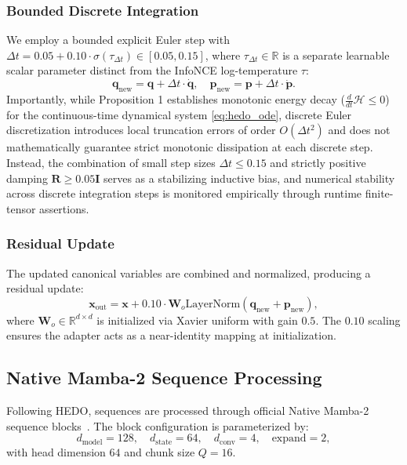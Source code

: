 \documentclass[conference]{IEEEtran}
\begin{document}
\subsubsection{Bounded Discrete Integration}
We employ a bounded explicit Euler step with $\Delta t = 0.05 + 0.10 \cdot \sigma(\tau_{\Delta t}) \in [0.05, 0.15]$, where $\tau_{\Delta t} \in \mathbb{R}$ is a separate learnable scalar parameter distinct from the InfoNCE log-temperature $\tau$:
\begin{equation}
\label{eq:euler_step}
\mathbf{q}_{\mathrm{new}} = \mathbf{q} + \Delta t \cdot \dot{\mathbf{q}}, \quad \mathbf{p}_{\mathrm{new}} = \mathbf{p} + \Delta t \cdot \dot{\mathbf{p}}.
\end{equation}
Importantly, while Proposition 1 establishes monotonic energy decay ($\frac{d}{dt}\mathcal{H} \le 0$) for the continuous-time dynamical system \eqref{eq:hedo_ode}, discrete Euler discretization introduces local truncation errors of order $O(\Delta t^2)$ and does not mathematically guarantee strict monotonic dissipation at each discrete step. Instead, the combination of small step sizes $\Delta t \le 0.15$ and strictly positive damping $\mathbf{R} \ge 0.05\mathbf{I}$ serves as a stabilizing inductive bias, and numerical stability across discrete integration steps is monitored empirically through runtime finite-tensor assertions.

\subsubsection{Residual Update}
The updated canonical variables are combined and normalized, producing a residual update:
\begin{equation}
\label{eq:hedo_out}
\mathbf{x}_{\mathrm{out}} = \mathbf{x} + 0.10 \cdot \mathbf{W}_o \mathrm{LayerNorm}(\mathbf{q}_{\mathrm{new}} + \mathbf{p}_{\mathrm{new}}),
\end{equation}
where $\mathbf{W}_o \in \mathbb{R}^{d \times d}$ is initialized via Xavier uniform with gain $0.5$. The $0.10$ scaling ensures the adapter acts as a near-identity mapping at initialization.

\subsection{Native Mamba-2 Sequence Processing}
Following HEDO, sequences are processed through official Native Mamba-2 sequence blocks~\cite{dao2024transformers}. The block configuration is parameterized by:
\begin{equation}
\label{eq:mamba2_params}
d_{\mathrm{model}} = 128, \quad d_{\mathrm{state}} = 64, \quad d_{\mathrm{conv}} = 4, \quad \mathrm{expand} = 2,
\end{equation}
with head dimension $64$ and chunk size $Q = 16$. 
\end{document}
